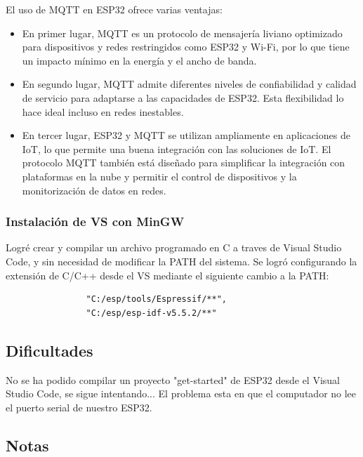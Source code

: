 \documentclass[12pt, a4paper]{article}
\begin{document}
    El uso de MQTT en ESP32 ofrece varias ventajas:

    \begin{itemize}
        \item En primer lugar, MQTT es un protocolo de mensajería liviano optimizado para dispositivos y redes restringidos como ESP32 y Wi-Fi, por lo que tiene un impacto mínimo en la energía y el ancho de banda.
        \item En segundo lugar, MQTT admite diferentes niveles de confiabilidad y calidad de servicio para adaptarse a las capacidades de ESP32. Esta flexibilidad lo hace ideal incluso en redes inestables.
        \item En tercer lugar, ESP32 y MQTT se utilizan ampliamente en aplicaciones de IoT, lo que permite una buena integración con las soluciones de IoT. El protocolo MQTT también está diseñado para simplificar la integración con plataformas en la nube y permitir el control de dispositivos y la monitorización de datos en redes.
    \end{itemize}

    {\color{red} \subsubsection*{Instalación de VS con MinGW}}

    Logré crear y compilar un archivo programado en C a traves de Visual Studio Code, y sin necesidad de modificar la PATH del sistema. Se logró configurando la extensión de C/C++ desde el VS mediante el siguiente cambio a la PATH:

    \begin{verbatim}
                "C:/esp/tools/Espressif/**",
                "C:/esp/esp-idf-v5.5.2/**"
    \end{verbatim}

    \subsection*{Dificultades}

    No se ha podido compilar un proyecto "get-started" de ESP32 desde el Visual Studio Code, se sigue intentando... El problema esta en que el computador no lee el puerto serial de nuestro ESP32.

    \subsection*{Notas}
\end{document}
